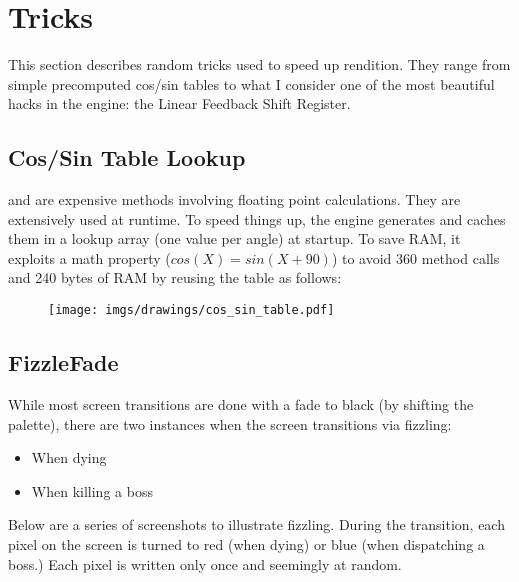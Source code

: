 \section{Tricks}

This section describes random tricks used to speed up rendition. They range from simple precomputed cos/sin tables to what I consider one of the most beautiful hacks in the engine: the Linear Feedback Shift Register.




\subsection{Cos/Sin Table Lookup}
 and  are expensive methods involving floating point calculations. They are extensively used at runtime. To speed things up, the engine generates and caches them in a lookup array (one value per angle) at startup. To save RAM, it exploits a math property ($cos(X) = sin(X + 90)$) to avoid 360  method calls and 240 bytes of RAM by reusing the  table as follows:\\
\par
\label{cossintable}
\begin{minipage}{\textwidth}

\end{minipage}


\begin{figure}[H]
 \centering
  \texttt{[image: imgs/drawings/cos\_sin\_table.pdf]}
\end{figure}








\subsection{FizzleFade}
While most screen transitions are done with a fade to black (by shifting the palette), there are two instances when the screen transitions via fizzling:
\begin{itemize}
	\item When dying
	\item When killing a boss
\end{itemize}
Below are a series of screenshots to illustrate fizzling. During the transition, each pixel on the screen is turned to red (when dying) or blue (when dispatching a boss.) Each pixel is written only once and seemingly at random. 



